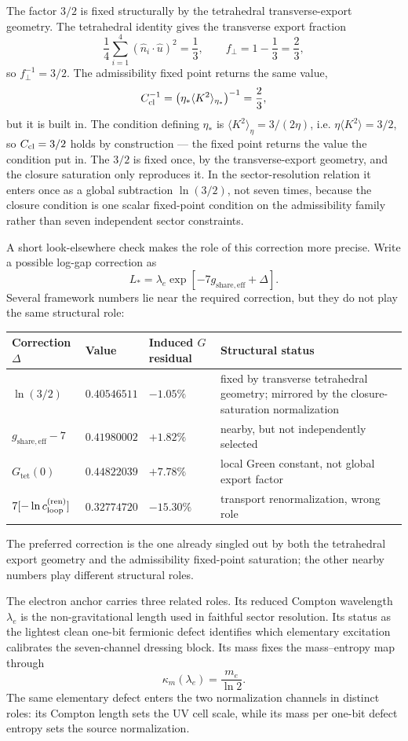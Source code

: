 \documentclass[11pt]{article}
\begin{document}
The factor $3/2$ is fixed structurally by the tetrahedral transverse-export geometry. The tetrahedral identity gives the transverse export fraction
\[
\frac14\sum_{i=1}^4(\hat n_i\cdot\hat u)^2=\frac13,
\qquad
f_\perp=1-\frac13=\frac23,
\]
so $f_\perp^{-1}=3/2$. The admissibility fixed point returns the same value,
\[
C_{\rm cl}^{-1}
=
\left(\eta_*\langle K^2\rangle_{\eta_*}\right)^{-1}
=
\frac23,
\]
but it is built in. The condition defining $\eta_*$ is $\langle K^2\rangle_\eta=3/(2\eta)$, i.e. $\eta\langle K^2\rangle=3/2$, so $C_{\rm cl}=3/2$ holds by construction --- the fixed point returns the value the condition put in. The $3/2$ is fixed once, by the transverse-export geometry, and the closure saturation only reproduces it. In the sector-resolution relation it enters once as a global subtraction $\ln(3/2)$, not seven times, because the closure condition is one scalar fixed-point condition on the admissibility family rather than seven independent sector constraints.

A short look-elsewhere check makes the role of this correction more precise. Write a possible log-gap correction as
\[
L_*=\lambda_e\exp[-7g_{\mathrm{share,eff}}+\Delta].
\]
Several framework numbers lie near the required correction, but they do not play the same structural role:
\begin{center}
\small
\begin{tabular}{p{}p{}p{}p{}}
\hline
Correction $\Delta$ & Value & Induced $G$ residual & Structural status \\
\hline
$\ln(3/2)$ & $0.40546511$ & $-1.05\%$ & fixed by transverse tetrahedral geometry; mirrored by the closure-saturation normalization \\
$g_{\mathrm{share,eff}}-7$ & $0.41980002$ & $+1.82\%$ & nearby, but not independently selected \\
$G_{\mathrm{tet}}(0)$ & $0.44822039$ & $+7.78\%$ & local Green constant, not global export factor \\
$7[-\ln c_{\rm loop}^{(\mathrm{ren})}]$ & $0.32774720$ & $-15.30\%$ & transport renormalization, wrong role \\
\hline
\end{tabular}
\normalsize
\end{center}
The preferred correction is the one already singled out by both the tetrahedral export geometry and the admissibility fixed-point saturation; the other nearby numbers play different structural roles.

The electron anchor carries three related roles. Its reduced Compton wavelength $\lambda_e$ is the non-gravitational length used in faithful sector resolution. Its status as the lightest clean one-bit fermionic defect identifies which elementary excitation calibrates the seven-channel dressing block. Its mass fixes the mass--entropy map through
\[
\kappa_m(\lambda_e)=\frac{m_e}{\ln2}.
\]
The same elementary defect enters the two normalization channels in distinct roles: its Compton length sets the UV cell scale, while its mass per one-bit defect entropy sets the source normalization.
\end{document}
